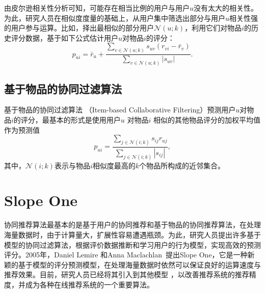 由皮尔逊相关性分析可知，可能存在相当比例的用户与用户$u$没有太大的相关性。为此，研究人员在相似度度量的基础上，从用户集中筛选出部分与用户$u$相关性强的用户参与运算。比如，择出最相似的部分用户$\mathcal N(u; k)$，利用它们对物品$i$的历史评分数据，基于如下公式估计用户$u$对物品$i$的评分：
\begin{equation}\label{eq:ucf}
    p_{ui} = \bar r_u + \frac{\sum\limits_{v \in \mathcal N(u; k)} s_{uv} (r_{vi} - \bar r_v)}{\sum\limits_{v \in \mathcal N(u; k)} |s_{uv}|}.
\end{equation}

\subsection{基于物品的协同过滤算法}
基于物品的协同过滤算法\cite{sarwar2001item,bell2007scalable} （Item-based Collaborative Filtering）预测用户$u$对物品$i$的评分，最基本的形式是使用用户$u$ 对物品$i$ 相似的其他物品评分的加权平均值作为预测值\cite{jannach2010recommender}
\begin{equation}\label{eq:icf}
    p_{ui} = \frac{\sum\limits_{j \in \mathcal N(i; k)} s_{ij} r_{uj}}{\sum\limits_{j \in \mathcal N(i; k)} |s_{ij}|},
\end{equation}
其中，$\mathcal N(i; k)$表示与物品$i$相似度最高的$k$个物品所构成的近邻集合。

\section{Slope One}
协同推荐算法最基本的是基于用户的协同推荐和基于物品的协同推荐算法，在处理海量数据时，由于计算量大，扩展性容易遭遇瓶颈。为此，研究人员提出许多基于模型的协同过滤算法，根据评价数据推断和学习用户的行为模型，实现高效的预测评分。2005年，Daniel Lemire 和Anna Maclachlan~\cite{lemire2005slope}提出Slope One，它是一种新颖的基于模型的评分预测模型，在处理海量数据时依然可以保证良好的运算速度与推荐效果。目前，研究人员已经将其引入到其他模型
\cite{gao2009personalized,wang2009personalized,zhang2009item,sun2011one}，以改善推荐系统的推荐精度，并成为各种在线推荐系统的一个重要算法。

